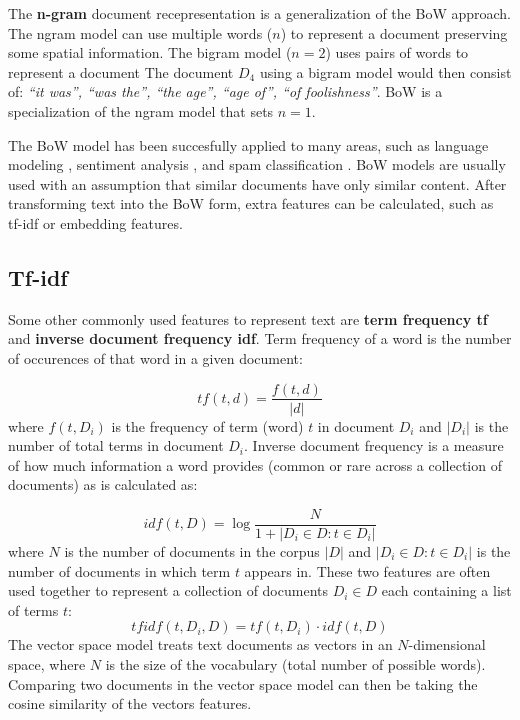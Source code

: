 The \textbf{n-gram} document recepresentation is a generalization of the BoW
approach. The ngram model
can use multiple words ($n$) to represent a document preserving some spatial information.
The bigram model ($n = 2$) uses pairs of words to represent a document
The document $D_4$ using a bigram model would then consist of:
\emph{``it was'', ``was the'', ``the age'', ``age of'', ``of foolishness''}.
BoW is a specialization of the ngram model
that sets $n=1$. 

The BoW model has been succesfully applied to many areas, such as language
modeling \citep{tirilly2008language}, sentiment analysis
\citep{wang2014microblog}, and spam classification \citep{kolari2006detecting}.
BoW models are
usually used with an assumption that similar documents have only similar
content. After transforming text into the BoW form, extra features can be
calculated, such as tf-idf or embedding features. 

\subsection{Tf-idf}
\label{sec:tf-idf}
Some other commonly used features  to represent text are \textbf{term frequency
tf} and \textbf{inverse document frequency idf}. Term frequency of a word is
the number of occurences of that word in a given document:

$$
\mathit{tf}(t, d) = \frac{f(t, d)}{|d|}
$$
where $f(t, D_i)$ is the frequency of term (word) $t$ in document $D_i$ and $|D_i|$ is the number
of total terms in document $D_i$.
Inverse document frequency is a measure of how much information a word provides (common or rare
across a collection of documents) as is calculated as:

\begin{equation}
	\label{eq:idf}
\mathit{idf}(t, D) = \log \frac{N}{1 + |D_i \in D: t \in D_i|}
\end{equation}
where $N$ is the number of documents in the corpus $|D|$ and $|D_i \in D: t \in D_i|$ is the 
number of documents in which term $t$ appears in. 
These two features are often used together to represent a collection of documents 
$D_i \in D$ each containing a list of terms $t$:
$$
\mathit{tfidf} (t, D_i, D) = \mathit{tf}(t, D_i) \cdot \mathit{idf}(t, D)
$$
The vector space model \citep{meadow1992text} treats text documents as vectors  
in an $N$-dimensional space, where $N$ is the size of the vocabulary (total number of 
possible words). Comparing two documents in the vector space model can then be taking the
cosine similarity of the vectors features.

